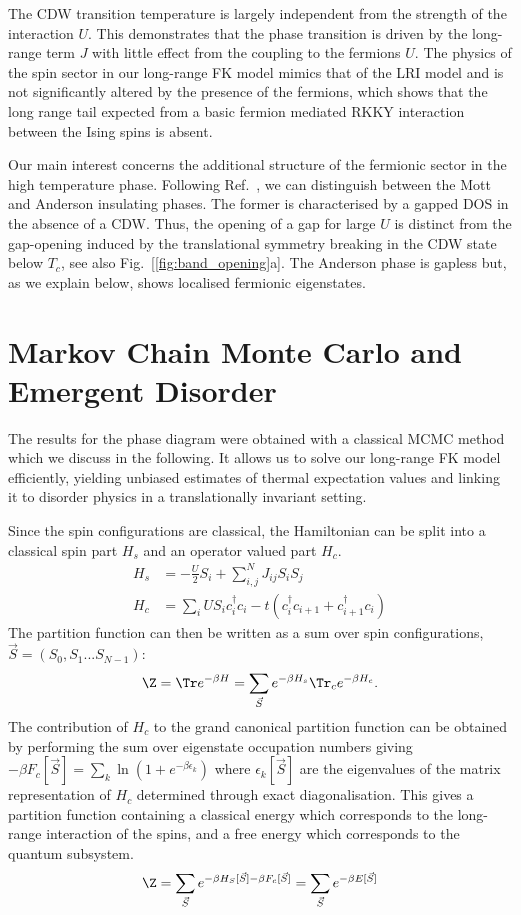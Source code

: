 The CDW transition temperature is largely independent from the strength of the interaction \(U\). This demonstrates that the phase transition is driven by the long-range term \(J\) with little effect from the coupling to the fermions \(U\).  The physics of the spin sector in our long-range \ac{FK} model mimics that of the \ac{LRI} model and is not significantly altered by the presence of the fermions, which shows that the long range tail expected from a basic fermion mediated RKKY interaction between the Ising spins is absent. 

Our main interest concerns the additional structure of the fermionic sector in the high temperature phase. Following Ref.~\cite{antipovInteractionTunedAndersonMott2016}, we can distinguish between the Mott and Anderson insulating phases. The former is characterised by a gapped \ac{DOS} in the absence of a \ac{CDW}. Thus, the opening of a gap for large \(U\) is distinct from the gap-opening induced by the translational symmetry breaking in the CDW state below \(T_c\), see also Fig.~[\ref{fig:band_opening}a]. The Anderson phase is gapless but, as we explain below, shows localised fermionic eigenstates. 

\section{Markov Chain Monte Carlo and Emergent Disorder}
The results for the phase diagram were obtained with a classical \ac{MCMC} method which we discuss in the following. It allows us to solve our long-range \ac{FK} model efficiently, yielding unbiased estimates of thermal expectation values and linking it to disorder physics in a translationally invariant setting.

Since the spin configurations are classical, the Hamiltonian can be split into a classical spin part \(H_s\) and an operator valued part \(H_c\).
\begin{align}
H_s& = - \frac{U}{2}S_i + \sum_{i, j}^{N} J_{ij} S_i S_j \\
H_c& = \sum_i U S_i c^\dag_{i}c_{i} -t(c^\dag_{i}c_{i+1} + c^\dag_{i+1}c_{i}) 
\end{align}
The partition function can then be written as a sum over spin configurations, \(\vec{S} = (S_0, S_1...S_{N-1})\):
\begin{align}
\Z = \Tr e^{-\beta H}= \sum_{\vec{S}} e^{-\beta H_s} \Tr_c e^{-\beta H_c} .
\end{align}
The contribution of \(H_c\) to the grand canonical partition function can be obtained by performing the sum over eigenstate occupation numbers giving \(-\beta F_c[\vec{S}] = \sum_k \ln{(1 + e^{- \beta \epsilon_k})}\) where \({\epsilon_k[\vec{S}]}\) are the eigenvalues of the matrix representation of \(H_c\) determined through exact diagonalisation. This gives a partition function containing a classical energy which corresponds to the long-range interaction of the spins, and a free energy which corresponds to the quantum subsystem. 
\begin{align}
\Z = \sum_{\vec{S}} e^{-\beta H_S[\vec{S}] - \beta F_c[\vec{S}]} = \sum_{\vec{S}} e^{-\beta E[\vec{S}]}
\end{align}

